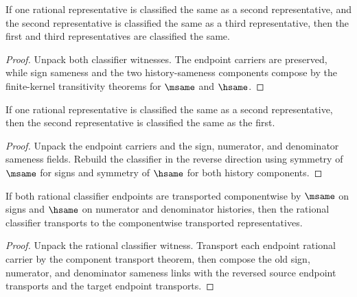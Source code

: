 \begin{theorem}
\label{thm:rat-classifier-transitivity}
If one rational representative is classified the same as a second representative, and the second representative is classified the same as a third representative, then the first and third representatives are classified the same.
\end{theorem}
\begin{proof}
Unpack both classifier witnesses. The endpoint carriers are preserved, while sign sameness and the two history-sameness components compose by the finite-kernel transitivity theorems for \(\msame\) and \(\hsame\).
\end{proof}

\begin{theorem}
\label{thm:rat-classifier-symmetry}
If one rational representative is classified the same as a second representative,
then the second representative is classified the same as the first.
\end{theorem}
\begin{proof}
Unpack the endpoint carriers and the sign, numerator, and denominator sameness
fields. Rebuild the classifier in the reverse direction using symmetry of
\(\msame\) for signs and symmetry of \(\hsame\) for both history components.
\end{proof}

\begin{theorem}
\label{thm:rat-classifier-component-transport}
If both rational classifier endpoints are transported componentwise by
\(\msame\) on signs and \(\hsame\) on numerator and denominator histories,
then the rational classifier transports to the componentwise transported
representatives.
\end{theorem}
\begin{proof}
Unpack the rational classifier witness. Transport each endpoint rational
carrier by the component transport theorem, then compose the old sign,
numerator, and denominator sameness links with the reversed source endpoint
transports and the target endpoint transports.
\end{proof}

